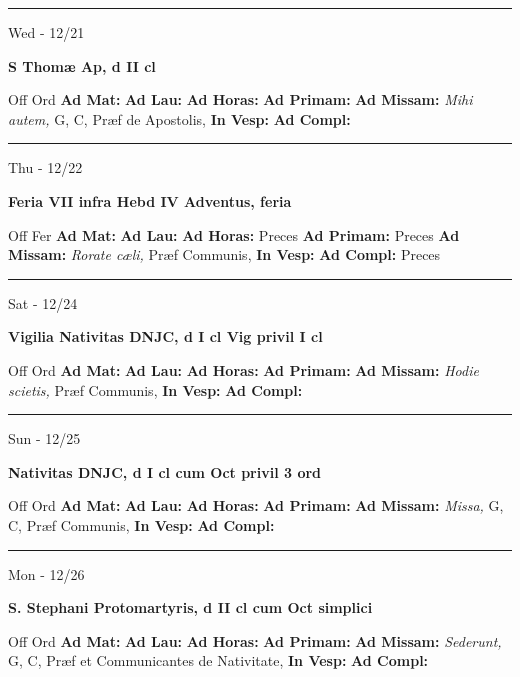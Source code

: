 \documentclass[letterpaper, 10pt]{article}
\begin{document}
\hrule
\begin{center}
Wed - 12/21
\end{center}\textbf{ \large S Thomæ Ap, \textnormal{\normalsize d II cl}}
\begin{justify}
Off Ord
\textbf{Ad Mat: }
\textbf{Ad Lau: }
\textbf{Ad Horas: }
\textbf{Ad Primam: }
\textbf{Ad Missam:} \textit{Mihi autem, } G, C, Præf de Apostolis, 
\textbf{In Vesp: }
\textbf{Ad Compl: }\end{justify}



\hrule
\begin{center}
Thu - 12/22
\end{center}\textbf{ \large Feria VII infra Hebd IV Adventus, \textnormal{\normalsize feria}}
\begin{justify}
Off Fer
\textbf{Ad Mat: }
\textbf{Ad Lau: }
\textbf{Ad Horas: }Preces
\textbf{Ad Primam: }Preces
\textbf{Ad Missam:} \textit{Rorate cæli, } Præf Communis, 
\textbf{In Vesp: }
\textbf{Ad Compl: }Preces\end{justify}



\hrule
\begin{center}
Sat - 12/24
\end{center}\textbf{ \large Vigilia Nativitas DNJC, \textnormal{\normalsize d I cl Vig privil I cl}}
\begin{justify}
Off Ord
\textbf{Ad Mat: }
\textbf{Ad Lau: }
\textbf{Ad Horas: }
\textbf{Ad Primam: }
\textbf{Ad Missam:} \textit{Hodie scietis, } Præf Communis, 
\textbf{In Vesp: }
\textbf{Ad Compl: }\end{justify}



\hrule
\begin{center}
Sun - 12/25
\end{center}\textbf{ \large Nativitas DNJC, \textnormal{\normalsize d I cl cum Oct privil 3 ord}}
\begin{justify}
Off Ord
\textbf{Ad Mat: }
\textbf{Ad Lau: }
\textbf{Ad Horas: }
\textbf{Ad Primam: }
\textbf{Ad Missam:} \textit{Missa, } G, C, Præf Communis, 
\textbf{In Vesp: }
\textbf{Ad Compl: }\end{justify}



\hrule
\begin{center}
Mon - 12/26
\end{center}\textbf{ \large S. Stephani Protomartyris, \textnormal{\normalsize d II cl cum Oct simplici}}
\begin{justify}
Off Ord
\textbf{Ad Mat: }
\textbf{Ad Lau: }
\textbf{Ad Horas: }
\textbf{Ad Primam: }
\textbf{Ad Missam:} \textit{Sederunt, } G, C, Præf et Communicantes de Nativitate, 
\textbf{In Vesp: }
\textbf{Ad Compl: }\end{justify}
\end{document}
